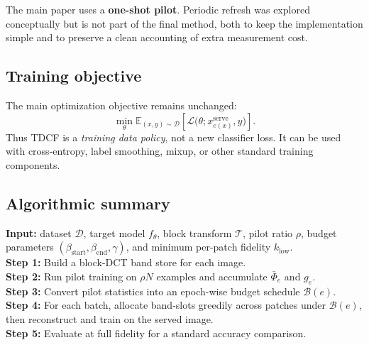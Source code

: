 \documentclass[10pt,twocolumn]{article}
\newcommand{\E}{\mathbb{E}}
\newcommand{\T}{\mathcal{T}}
\newcommand{\D}{\mathcal{D}}
\newcommand{\Lagr}{\mathcal{L}}
\begin{document}
The main paper uses a \textbf{one-shot pilot}. Periodic refresh was explored conceptually but is not part of the final method, both to keep the implementation simple and to preserve a clean accounting of extra measurement cost.

\subsection{Training objective}
The main optimization objective remains unchanged:
\begin{equation}
    \min_{\theta} \E_{(x,y)\sim\D} \left[\Lagr\big(\theta; x^{\text{serve}}_{e(x)}, y\big)\right].
\end{equation}
Thus TDCF is a \emph{training data policy}, not a new classifier loss. It can be used with cross-entropy, label smoothing, mixup, or other standard training components.

\subsection{Algorithmic summary}
\textbf{Input:} dataset $\D$, target model $f_\theta$, block transform $\T$, pilot ratio $\rho$, budget parameters $(\beta_{\mathrm{start}}, \beta_{\mathrm{end}}, \gamma)$, and minimum per-patch fidelity $k_{\mathrm{low}}$.\\
\textbf{Step 1:} Build a block-DCT band store for each image.\\
\textbf{Step 2:} Run pilot training on $\rho N$ examples and accumulate $\bar\Phi_e$ and $g_e$.\\
\textbf{Step 3:} Convert pilot statistics into an epoch-wise budget schedule $\mathcal{B}(e)$.\\
\textbf{Step 4:} For each batch, allocate band-slots greedily across patches under $\mathcal{B}(e)$, then reconstruct and train on the served image.\\
\textbf{Step 5:} Evaluate at full fidelity for a standard accuracy comparison.
\end{document}
